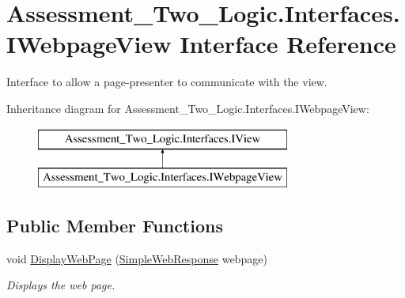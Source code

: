 \hypertarget{interface_assessment___two___logic_1_1_interfaces_1_1_i_webpage_view}{
\section{Assessment\_\-Two\_\-Logic.Interfaces.IWebpageView Interface Reference}
\label{interface_assessment___two___logic_1_1_interfaces_1_1_i_webpage_view}
}


Interface to allow a page-\/presenter to communicate with the view.  


Inheritance diagram for Assessment\_\-Two\_\-Logic.Interfaces.IWebpageView:\begin{figure}[H]
\begin{center}
\leavevmode
\includegraphics[height=2.000000cm]{interface_assessment___two___logic_1_1_interfaces_1_1_i_webpage_view}
\end{center}
\end{figure}
\subsection*{Public Member Functions}
\begin{DoxyCompactItemize}
\item 
void \hyperlink{interface_assessment___two___logic_1_1_interfaces_1_1_i_webpage_view_ac70f0deac5cc1beacfbbd752012d2c28}{DisplayWebPage} (\hyperlink{class_assessment___two___logic_1_1_model_1_1_simple_web_response}{SimpleWebResponse} webpage)
\begin{DoxyCompactList}\small\item\em Displays the web page. \item\end{DoxyCompactList}\end{DoxyCompactItemize}
